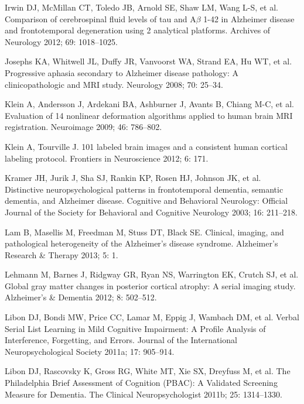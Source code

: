 \documentclass[]{article}
\begin{document}
\hypertarget{ref-irwin_comparison_2012}{}
Irwin DJ, McMillan CT, Toledo JB, Arnold SE, Shaw LM, Wang L-S, et al.
Comparison of cerebrospinal fluid levels of tau and A\(\beta\) 1-42 in
Alzheimer disease and frontotemporal degeneration using 2 analytical
platforms. Archives of Neurology 2012; 69: 1018--1025.

\hypertarget{ref-josephs_progressive_2008}{}
Josephs KA, Whitwell JL, Duffy JR, Vanvoorst WA, Strand EA, Hu WT, et
al. Progressive aphasia secondary to Alzheimer disease pathology: A
clinicopathologic and MRI study. Neurology 2008; 70: 25--34.

\hypertarget{ref-klein_evaluation_2009}{}
Klein A, Andersson J, Ardekani BA, Ashburner J, Avants B, Chiang M-C, et
al. Evaluation of 14 nonlinear deformation algorithms applied to human
brain MRI registration. Neuroimage 2009; 46: 786--802.

\hypertarget{ref-klein_101_2012}{}
Klein A, Tourville J. 101 labeled brain images and a consistent human
cortical labeling protocol. Frontiers in Neuroscience 2012; 6: 171.

\hypertarget{ref-kramer_distinctive_2003}{}
Kramer JH, Jurik J, Sha SJ, Rankin KP, Rosen HJ, Johnson JK, et al.
Distinctive neuropsychological patterns in frontotemporal dementia,
semantic dementia, and Alzheimer disease. Cognitive and Behavioral
Neurology: Official Journal of the Society for Behavioral and Cognitive
Neurology 2003; 16: 211--218.

\hypertarget{ref-lam_clinical_2013}{}
Lam B, Masellis M, Freedman M, Stuss DT, Black SE. Clinical, imaging,
and pathological heterogeneity of the Alzheimer's disease syndrome.
Alzheimer's Research \& Therapy 2013; 5: 1.

\hypertarget{ref-lehmann_global_2012}{}
Lehmann M, Barnes J, Ridgway GR, Ryan NS, Warrington EK, Crutch SJ, et
al. Global gray matter changes in posterior cortical atrophy: A serial
imaging study. Alzheimer's \& Dementia 2012; 8: 502--512.

\hypertarget{ref-libon_verbal_2011}{}
Libon DJ, Bondi MW, Price CC, Lamar M, Eppig J, Wambach DM, et al.
Verbal Serial List Learning in Mild Cognitive Impairment: A Profile
Analysis of Interference, Forgetting, and Errors. Journal of the
International Neuropsychological Society 2011a; 17: 905--914.

\hypertarget{ref-libon_philadelphia_2011}{}
Libon DJ, Rascovsky K, Gross RG, White MT, Xie SX, Dreyfuss M, et al.
The Philadelphia Brief Assessment of Cognition (PBAC): A Validated
Screening Measure for Dementia. The Clinical Neuropsychologist 2011b;
25: 1314--1330.
\end{document}
